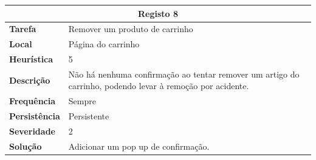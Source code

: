\documentclass[a4paper,12pt]{article}
\begin{document}
\begin{center}
    \newpage
    \begin{table}[h!]
        \centering
        \begin{tabular}{|m{3cm}|m{12cm}|}
            \hline
            \multicolumn{2}{|c|}{\textbf{Registo 8}}                                                                                          \\ \hline
            \textbf{Tarefa}       & Remover um produto de carrinho                                                                            \\ \hline
            \textbf{Local}        & Página do carrinho                                                                                        \\ \hline
            \textbf{Heurística}   & 5                                                                                                         \\ \hline
            \textbf{Descrição}    & Não há nenhuma confirmação ao tentar remover um artigo do carrinho, podendo levar à remoção por acidente. \\ \hline
            \textbf{Frequência}   & Sempre                                                                                                    \\ \hline
            \textbf{Persistência} & Persistente                                                                                               \\ \hline
            \textbf{Severidade}   & 2                                                                                                         \\ \hline
            \textbf{Solução}      & Adicionar um pop up de confirmação.                                                                       \\ \hline
        \end{tabular}
    \end{table}


\end{center}
\end{document}
